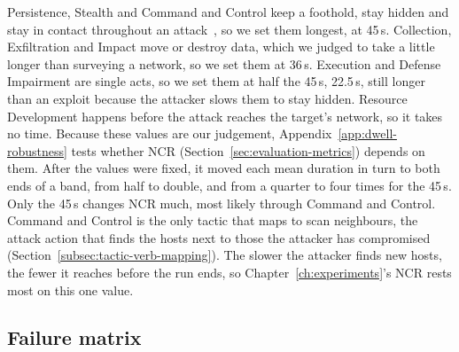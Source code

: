\documentclass{cshonours}
\begin{document}
Persistence, Stealth
and Command and Control keep a foothold, stay hidden and stay in contact
throughout an attack~\citep{mitre2026attackkb}, so we set them longest, at
45\,s. Collection, Exfiltration and Impact move or destroy data, which we
judged to take a little longer than surveying a network, so we set them at
36\,s. Execution and Defense Impairment are single acts, so we set them at
half the 45\,s, 22.5\,s, still longer than an exploit because the attacker slows
them to stay hidden. Resource Development happens before the attack reaches the
target's network, so it takes no time.
Because these values are our judgement,
Appendix~\ref{app:dwell-robustness} tests whether NCR
(Section~\ref{sec:evaluation-metrics}) depends on them. After the values were
fixed, it moved each mean duration in turn to both ends of a band, from half
to double, and from a quarter to four times for the 45\,s. Only the 45\,s changes NCR much,
most likely through Command and Control.
Command and Control is the only tactic that maps to scan neighbours, the
attack action that finds the hosts next to those the attacker has compromised
(Section~\ref{subsec:tactic-verb-mapping}). The slower the attacker finds new
hosts, the fewer it reaches before the run ends, so Chapter~\ref{ch:experiments}'s
NCR rests most on this one value.

\subsection{Failure matrix}
\label{subsec:failure-matrix}
\end{document}
